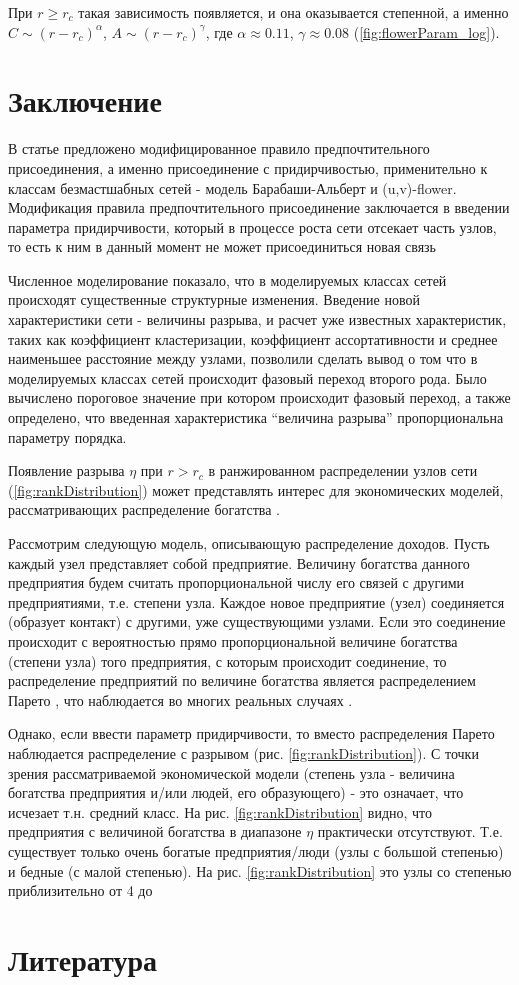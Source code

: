 \documentclass[10pt,aps,pra]{revtex4-1}
\begin{document}
        При $r \geq r_c$ такая зависимость появляется, и она оказывается степенной, а именно $C \sim {(r-r_c)}^\alpha$, $A \sim {(r-r_c)}^\gamma$, где $\alpha \approx 0.11$, $\gamma \approx 0.08$ (\ref{fig:flowerParam_log}).

\section{Заключение}

    В статье предложено модифицированное правило предпочтительного присоединения, а именно присоединение с придирчивостью, применительно к классам безмастшабных сетей - модель Барабаши-Альберт и (u,v)-flower. Модификация правила предпочтительного присоединение заключается в введении параметра придирчивости, который в процессе роста сети отсекает часть узлов,  то есть к ним в данный момент не может присоединиться новая связь

    Численное моделирование показало, что в моделируемых классах сетей происходят существенные структурные изменения. Введение новой характеристики сети - величины разрыва, и расчет уже известных характеристик, таких как коэффициент кластеризации, коэффициент ассортативности и среднее наименьшее расстояние между узлами, позволили сделать вывод о том что в моделируемых классах сетей происходит фазовый переход второго рода. Было вычислено пороговое значение при котором происходит фазовый переход, а также определено, что введенная характеристика ``величина разрыва'' пропорциональна параметру порядка.

    Появление разрыва $\eta$ при $r>r_c$ в ранжированном распределении узлов сети (\ref{fig:rankDistribution}) может представлять интерес для экономических моделей, рассматривающих распределение богатства \cite{Economics2}.

    Рассмотрим следующую модель, описывающую распределение доходов. Пусть каждый узел представляет собой предприятие. Величину богатства данного предприятия будем считать пропорциональной числу его связей с другими предприятиями, т.е. степени узла. Каждое новое предприятие (узел) соединяется (образует контакт) с другими, уже существующими узлами. Если это соединение происходит с вероятностью прямо пропорциональной величине богатства (степени узла) того предприятия, с которым происходит соединение, то распределение предприятий по величине богатства является распределением Парето \cite{Economics2, Economics1}, что наблюдается во многих реальных случаях \cite{Economics1}.

    Однако, если ввести параметр придирчивости, то вместо распределения Парето наблюдается распределение с разрывом (рис. \ref{fig:rankDistribution}). С точки зрения рассматриваемой экономической модели (степень узла - величина богатства предприятия и/или людей, его образующего) - это означает, что исчезает т.н. средний класс. На рис. \ref{fig:rankDistribution} видно, что предприятия с величиной богатства в диапазоне $\eta$ практически отсутствуют. Т.е. существует только очень богатые предприятия/люди (узлы  с большой степенью) и бедные (с малой степенью). На рис. \ref{fig:rankDistribution} это узлы со степенью приблизительно от 4 до 

\section{Литература}

 

\end{document}
